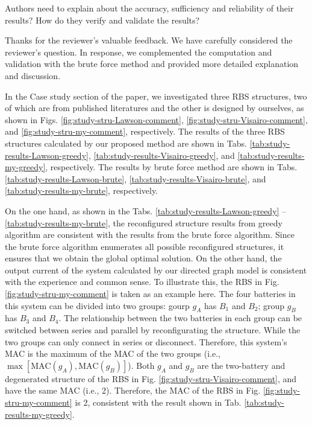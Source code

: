 \begin{revcomment}
  Authors need to explain about the accuracy, sufficiency and reliability of their results? How do they verify and validate the results?
\end{revcomment}
\begin{revresponse}

Thanks for the reviewer's valuable feedback. 
We have carefully considered the reviewer's question.
In response, we complemented the computation and validation with the brute force method and provided more detailed explanation and discussion.


In the Case study section of the paper, we investigated three RBS structures, two of which are from published literatures \cite{lawsonSoftwareConfigurableBattery2012,visairoReconfigurableBatteryPack2008} and the other is designed by ourselves, as shown in Figs. \ref{fig:study-stru-Lawson-comment}, \ref{fig:study-stru-Visairo-comment}, and \ref{fig:study-stru-my-comment}, respectively.
The results of the three RBS structures calculated by our proposed method are shown in Tabs. \ref{tab:study-results-Lawson-greedy}, \ref{tab:study-results-Visairo-greedy}, and \ref{tab:study-results-my-greedy}, respectively.
The results by brute force method are shown in Tabs. \ref{tab:study-results-Lawson-brute}, \ref{tab:study-results-Visairo-brute}, and \ref{tab:study-results-my-brute}, respectively.


On the one hand, as shown in the Tabs. \ref{tab:study-results-Lawson-greedy} -- \ref{tab:study-results-my-brute}, the reconfigured structure results from greedy algorithm are consistent with the results from the brute force algorithm.
Since the brute force algorithm enumerates all possible reconfigured structures, it ensures that we obtain the global optimal solution.
On the other hand, the output current of the system calculated by our directed graph model is consistent with the experience and common sense.
To illustrate this, the RBS in Fig. \ref{fig:study-stru-my-comment} is taken as an example here.
The four batteries in this system can be divided into two groups: gourp $g_A$ has $B_1$ and $B_2$; group $g_B$ has $B_3$ and $B_4$.
The relationship between the two batteries in each group can be switched between series and parallel by reconfigurating the structure.
While the two groups can only connect in series or disconnect.
Therefore, this system's MAC is the maximum of the MAC of the two groups (i.e., $\max[\text{MAC}(g_A),\text{MAC}(g_B)]$).
Both $g_A$ and $g_B$ are the two-battery and degenerated structure of the RBS in Fig. \ref{fig:study-stru-Visairo-comment}, and have the same MAC (i.e., 2).
Therefore, the MAC of the RBS in Fig. \ref{fig:study-stru-my-comment} is 2, consistent with the result shown in Tab. \ref{tab:study-results-my-greedy}.



\end{revresponse}
